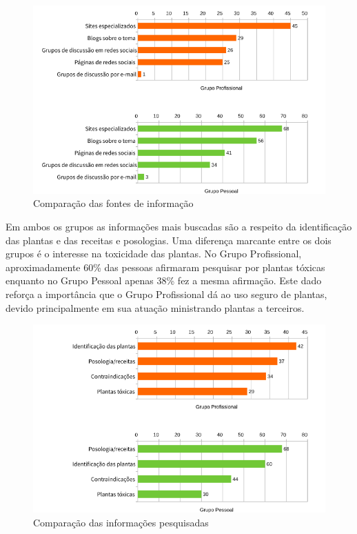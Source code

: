 \begin{figure}[!htbp]
\centering
\caption{\label{graf-canais}Comparação das fontes de informação}
\includegraphics[width=\textwidth]{images/canais.png}
\end{figure}


Em ambos os grupos as informações mais buscadas são a respeito da identificação das plantas e das receitas e posologias. Uma diferença marcante entre os dois grupos é o interesse na toxicidade das plantas. No Grupo Profissional, aproximadamente 60\% das pessoas afirmaram pesquisar por plantas tóxicas enquanto no Grupo Pessoal apenas 38\% fez a mesma afirmação. Este dado reforça a importância que o Grupo Profissional dá ao uso seguro de plantas, devido principalmente em sua atuação ministrando plantas a terceiros.

\begin{figure}[!htbp]
\centering
\caption{\label{graf-infos}Comparação das informações pesquisadas}
\includegraphics[width=\textwidth]{images/info.png}
\end{figure}


